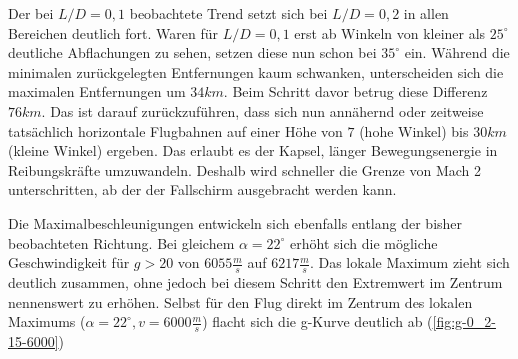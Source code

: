 Der bei $L/D = 0,1$ beobachtete Trend setzt sich bei $L/D = 0,2$ in allen Bereichen deutlich fort. Waren für $L/D = 0,1$ erst ab Winkeln von kleiner als $25^{\circ}$ deutliche Abflachungen zu sehen, setzen diese nun schon bei $35^{\circ}$ ein. Während die minimalen zurückgelegten Entfernungen kaum schwanken, unterscheiden sich die maximalen Entfernungen um $34km$. Beim Schritt davor betrug diese Differenz $76km$. Das ist darauf zurückzuführen, dass sich nun annähernd oder zeitweise tatsächlich horizontale Flugbahnen auf einer Höhe von $7$ (hohe Winkel) bis $30km$ (kleine Winkel) ergeben. Das erlaubt es der Kapsel, länger Bewegungsenergie in Reibungskräfte umzuwandeln. Deshalb wird schneller die Grenze von Mach 2 unterschritten, ab der der Fallschirm ausgebracht werden kann.

Die Maximalbeschleunigungen entwickeln sich ebenfalls entlang der bisher beobachteten Richtung. Bei gleichem $\alpha = 22^{\circ}$ erhöht sich die mögliche Geschwindigkeit für $g > 20$ von $6055\frac{m}{s}$ auf $6217\frac{m}{s}$. Das lokale Maximum zieht sich deutlich zusammen, ohne jedoch bei diesem Schritt den Extremwert im Zentrum nennenswert zu erhöhen. Selbst für den Flug direkt im Zentrum des lokalen Maximums ($\alpha = 22^{\circ}, v = 6000\frac{m}{s}$) flacht sich die g-Kurve deutlich ab (\ref{fig:g-0_2-15-6000})

